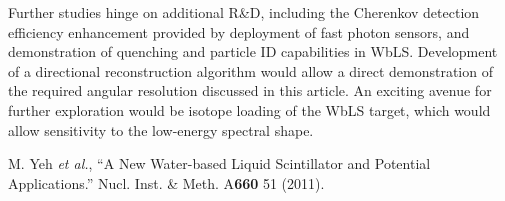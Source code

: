 \documentclass[11pt,prd,letterpaper,amsmath,amssymb,final,nofootinbib
,unsortedaddress,superscriptaddress
]{revtex4-1}
\begin{document}
Further studies hinge on additional R\&D, including the Cherenkov detection efficiency enhancement provided by deployment of fast photon sensors, and demonstration of quenching and particle ID capabilities in WbLS.  Development of a directional reconstruction algorithm would allow a direct demonstration of the required angular resolution discussed in this article.  An exciting avenue for further exploration would be isotope loading of the WbLS target, which would allow sensitivity to the low-energy spectral shape.


\begin{thebibliography}{00}

M. Yeh {\it et al.}, { ``A New Water-based Liquid Scintillator and Potential Applications.''} 
Nucl. Inst. \& Meth. A{\bf 660} 51 (2011).



\end{thebibliography}
\end{document}

